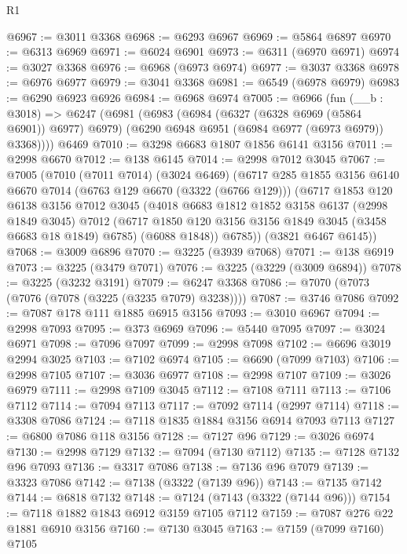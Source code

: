 \begin{lexlean}{R1}
\begin{coremodule}
@6967 := @3011 @3368
@6968 := @6293 @6967
@6969 := @5864 @6897
@6970 := @6313 @6969
@6971 := @6024 @6901
@6973 := @6311 (@6970 @6971)
@6974 := @3027 @3368
@6976 := @6968 (@6973 @6974)
@6977 := @3037 @3368
@6978 := @6976 @6977
@6979 := @3041 @3368
@6981 := @6549 (@6978 @6979)
@6983 := @6290 @6923 @6926
@6984 := @6968 @6974
@7005 := @6966
    (fun (__b : @3018) =>
    @6247
      (@6981
        (@6983
          (@6984 (@6327 (@6328 @6969 (@5864 @6901)) @6977) @6979)
          (@6290 @6948 @6951 (@6984 @6977 (@6973 @6979)) @3368))))
    @6469
@7010 := @3298 @6683 @1807 @1856 @6141 @3156
@7011 := @2998 @6670
@7012 := @138 @6145
@7014 := @2998 @7012 @3045
@7067 := @7005
    (@7010
      (@7011 @7014)
      (@3024 @6469)
      (@6717
        @285
        @1855
        @3156
        @6140
        @6670
        @7014
        (@6763 @129 @6670 (@3322 (@6766 @129)))
        (@6717
          @1853
          @120
          @6138
          @3156
          @7012
          @3045
          (@4018
            @6683
            @1812
            @1852
            @3158
            @6137
            (@2998 @1849 @3045)
            @7012
            (@6717 @1850 @120 @3156 @3156 @1849 @3045 (@3458 @6683 @18 @1849) @6785)
            (@6088 @1848))
          @6785))
      (@3821 @6467 @6145))
@7068 := @3009 @6896
@7070 := @3225 (@3939 @7068)
@7071 := @138 @6919
@7073 := @3225 (@3479 @7071)
@7076 := @3225 (@3229 (@3009 @6894))
@7078 := @3225 (@3232 @3191)
@7079 := @6247 @3368
@7086 := @7070 (@7073 (@7076 (@7078 (@3225 (@3235 @7079) @3238))))
@7087 := @3746 @7086
@7092 := @7087 @178 @111 @1885 @6915 @3156
@7093 := @3010 @6967
@7094 := @2998 @7093
@7095 := @373 @6969
@7096 := @5440 @7095
@7097 := @3024 @6971
@7098 := @7096 @7097
@7099 := @2998 @7098
@7102 := @6696 @3019 @2994 @3025
@7103 := @7102 @6974
@7105 := @6690 (@7099 @7103)
@7106 := @2998 @7105
@7107 := @3036 @6977
@7108 := @2998 @7107
@7109 := @3026 @6979
@7111 := @2998 @7109 @3045
@7112 := @7108 @7111
@7113 := @7106 @7112
@7114 := @7094 @7113
@7117 := @7092 @7114 (@2997 @7114)
@7118 := @3308 @7086
@7124 := @7118 @1835 @1884 @3156 @6914 @7093 @7113
@7127 := @6800 @7086 @118 @3156
@7128 := @7127 @96
@7129 := @3026 @6974
@7130 := @2998 @7129
@7132 := @7094 (@7130 @7112)
@7135 := @7128 @7132 @96 @7093
@7136 := @3317 @7086
@7138 := @7136 @96 @7079
@7139 := @3323 @7086
@7142 := @7138 (@3322 (@7139 @96))
@7143 := @7135 @7142
@7144 := @6818 @7132
@7148 := @7124 (@7143 (@3322 (@7144 @96)))
@7154 := @7118 @1882 @1843 @6912 @3159 @7105 @7112
@7159 := @7087 @276 @22 @1881 @6910 @3156
@7160 := @7130 @3045
@7163 := @7159 (@7099 @7160) @7105

\end{coremodule}
\end{lexlean}
